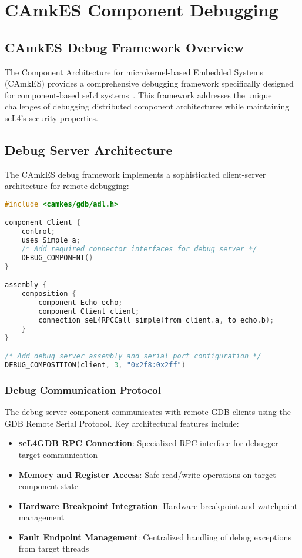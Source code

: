 \documentclass[11pt,a4paper]{article}
\begin{document}
\section{CAmkES Component Debugging}

\subsection{CAmkES Debug Framework Overview}

The Component Architecture for microkernel-based Embedded Systems (CAmkES) provides a comprehensive debugging framework specifically designed for component-based seL4 systems~\cite{Kuz2007camkes}. This framework addresses the unique challenges of debugging distributed component architectures while maintaining seL4's security properties.

\subsection{Debug Server Architecture}

The CAmkES debug framework implements a sophisticated client-server architecture for remote debugging:

\begin{lstlisting}[caption=CAmkES Debug Component Integration, language=C]
#include <camkes/gdb/adl.h>

component Client {
    control;
    uses Simple a;
    /* Add required connector interfaces for debug server */
    DEBUG_COMPONENT()
}

assembly {
    composition {
        component Echo echo;
        component Client client;
        connection seL4RPCCall simple(from client.a, to echo.b);
    }
}

/* Add debug server assembly and serial port configuration */
DEBUG_COMPOSITION(client, 3, "0x2f8:0x2ff")
\end{lstlisting}

\subsubsection{Debug Communication Protocol}

The debug server component communicates with remote GDB clients using the GDB Remote Serial Protocol. Key architectural features include:

\begin{itemize}
\item \textbf{seL4GDB RPC Connection}: Specialized RPC interface for debugger-target communication
\item \textbf{Memory and Register Access}: Safe read/write operations on target component state
\item \textbf{Hardware Breakpoint Integration}: Hardware breakpoint and watchpoint management
\item \textbf{Fault Endpoint Management}: Centralized handling of debug exceptions from target threads
\end{itemize}
\end{document}

